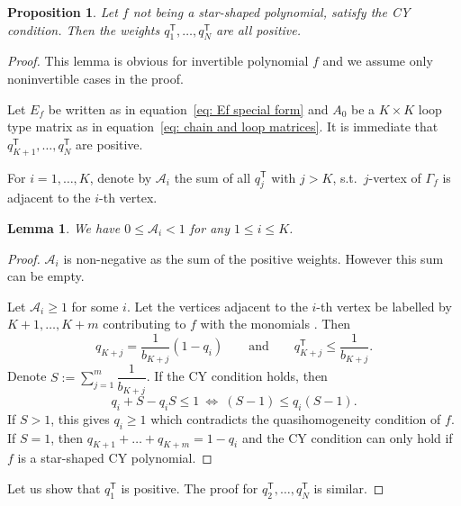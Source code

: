 \documentclass[10pt,a4paper]{amsart}
\numberwithin{equation}{section}
\newtheorem{Lemma}[Theorem]{Lemma}
\newtheorem{Proposition}[Theorem]{Proposition}
 { \theoremstyle{definition}
\newtheorem{Definition}[Theorem]{Definition}
\newtheorem{Note}[Theorem]{Note}
\newtheorem{Example}[Theorem]{Example}
\newtheorem{Remark}[Theorem]{Remark} }
\def\A{{\mathcal A}}
\begin{document}
\begin{Proposition}
 Let $f$ not being a star-shaped polynomial, satisfy the CY condition. Then the weights $q_1^{\mathsf{T}}, \dots, q_N^{\mathsf{T}}$ are all positive.
\end{Proposition}
\begin{proof}
 This lemma is obvious for invertible polynomial $f$ and we assume only noninvertible cases in the proof.

 Let $E_f$ be written as in equation~\eqref{eq: Ef special form} and $A_0$ be a $K \times K$ loop type matrix as in equation~\eqref{eq: chain and loop matrices}. It is immediate that $q_{K+1}^{\mathsf{T}},\dots,q_N^{\mathsf{T}}$ are positive.

 For $i=1,\dots,K$, denote by $\A_i$ the sum of all $q_j^{\mathsf{T}}$ with $j > K$, s.t.\ $j$-vertex of $\Gamma_f$ is adjacent to the $i$-th vertex.

 \begin{Lemma}
 We have $0 \le \A_i < 1$ for any $1 \le i \le K$.
 \end{Lemma}
 \begin{proof}
 $\A_i$ is non-negative as the sum of the positive weights. However this sum can be empty.

 Let $\A_i \ge 1$ for some $i$. Let the vertices adjacent to the $i$-th vertex be labelled by $K+1,\dots,K+m$ contributing to $f$ with the monomials .
 Then
 \[
 q_{K+j} = \frac{1}{b_{K+j}}(1 - q_i) \qquad \text{and} \qquad q_{K+j}^{\mathsf{T}} \le \frac{1}{b_{K+j}}.
 \]
 Denote $S := \sum_{j=1}^m \dfrac{1}{b_{K+j}}$. If the CY condition holds, then
 \[
 q_i + S - q_i S \le 1 \ \Leftrightarrow \ (S - 1) \le q_i(S-1).
 \]
 If $S > 1$, this gives $q_i \ge 1$ which contradicts the quasihomogeneity condition of $f$. If $S=1$, then $q_{K+1} + \dots + q_{K+m} = 1 - q_i$ and the CY condition can only hold if $f$ is a star-shaped CY polynomial.
 \end{proof}

 Let us show that $q_1^{\mathsf{T}}$ is positive. The proof for $q_2^{\mathsf{T}},\dots,q_N^{\mathsf{T}}$ is similar.


\end{proof}
\end{document}
